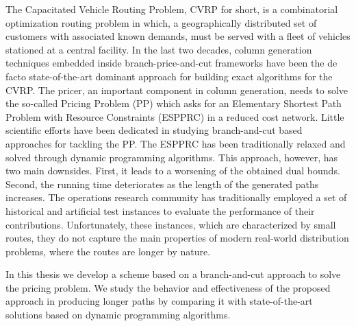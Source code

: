 \noindent The Capacitated Vehicle Routing Problem, CVRP for short,
is a combinatorial optimization routing problem in which,
a geographically distributed set of customers with associated known demands,
must be served with a fleet of vehicles stationed at a central facility.
In the last two decades,
column generation techniques embedded inside branch-price-and-cut frameworks
have been the de facto state-of-the-art dominant approach
for building exact algorithms for the CVRP.
The pricer, an important component in column generation, needs to solve
the so-called Pricing Problem (PP) which asks for an
Elementary Shortest Path Problem with Resource Constraints (ESPPRC)
in a reduced cost network.
Little scientific efforts have been dedicated in studying
branch-and-cut based approaches for tackling the PP.
The ESPPRC has been traditionally relaxed and solved through dynamic programming
algorithms.
This approach, however, has two main downsides.
First, it leads to a worsening of the obtained dual bounds.
Second, the running time deteriorates as the length of the generated paths increases.
The operations research community has traditionally employed
a set of historical and artificial test instances to evaluate
the performance of their contributions.
Unfortunately, these instances, which are characterized by small routes,
they do not capture the main properties of modern real-world distribution problems,
where the routes are longer by nature.

\noindent In this thesis we develop
a scheme based on a branch-and-cut approach to solve the pricing problem.
We study the behavior and effectiveness of the proposed approach in producing longer paths
by comparing it with state-of-the-art solutions based on dynamic programming algorithms.
